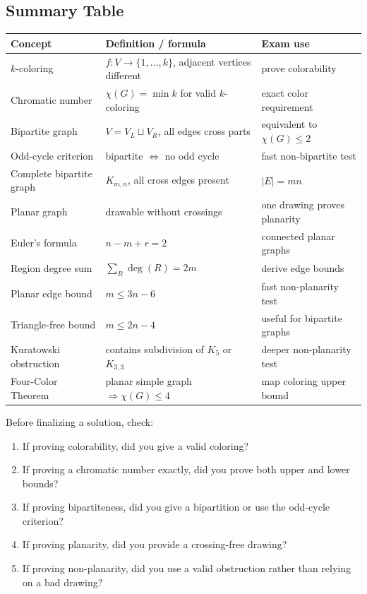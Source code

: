 \subsection{Summary Table}

\begin{center}
\small
\begin{tabular}{@{}p{}p{}p{}@{}}
\toprule
\textbf{Concept} & \textbf{Definition / formula} & \textbf{Exam use} \\
\midrule
\(k\)-coloring & \(f:V\to\{1,\dots,k\}\), adjacent vertices different & prove colorability \\
Chromatic number & \(\chi(G)=\min k\) for valid \(k\)-coloring & exact color requirement \\
Bipartite graph & \(V=V_L\sqcup V_R\), all edges cross parts & equivalent to \(\chi(G)\le 2\) \\
Odd-cycle criterion & bipartite \(\Longleftrightarrow\) no odd cycle & fast non-bipartite test \\
Complete bipartite graph & \(K_{m,n}\), all cross edges present & \(|E|=mn\) \\
Planar graph & drawable without crossings & one drawing proves planarity \\
Euler's formula & \(n-m+r=2\) & connected planar graphs \\
Region degree sum & \(\sum_R\deg(R)=2m\) & derive edge bounds \\
Planar edge bound & \(m\le 3n-6\) & fast non-planarity test \\
Triangle-free bound & \(m\le 2n-4\) & useful for bipartite graphs \\
Kuratowski obstruction & contains subdivision of \(K_5\) or \(K_{3,3}\) & deeper non-planarity test \\
Four-Color Theorem & planar simple graph \(\Rightarrow \chi(G)\le 4\) & map coloring upper bound \\
\bottomrule
\end{tabular}
\end{center}

\begin{examtip}[title={Final checklist for Handout 09}]
Before finalizing a solution, check:
\begin{enumerate}[leftmargin=*]
    \item If proving colorability, did you give a valid coloring?
    \item If proving a chromatic number exactly, did you prove both upper and lower bounds?
    \item If proving bipartiteness, did you give a bipartition or use the odd-cycle criterion?
    \item If proving planarity, did you provide a crossing-free drawing?
    \item If proving non-planarity, did you use a valid obstruction rather than relying on a bad drawing?
\end{enumerate}
\end{examtip}

